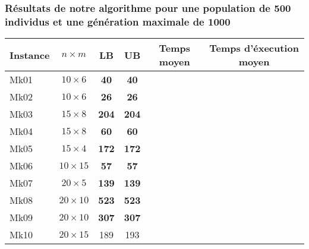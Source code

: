 \subsubsection{Résultats de notre algorithme pour une population de 500 individus et une génération maximale de 1000}

\begin{table}[!h]
    \renewcommand{\arraystretch}{1.5}
    \centering
    \begin{tabular}{p{} c c c c c}
        Instance & $n \times m$ & LB & UB & Temps moyen & Temps d'éxecution moyen \\
         \hline
        Mk01 & $10 \times 6$ & \textbf{40} & \textbf{40} & & \\
         \hline
        Mk02 & $10 \times 6$ & \textbf{26} & \textbf{26} & & \\
         \hline
        Mk03 & $15 \times 8$ & \textbf{204} & \textbf{204} & & \\
         \hline
        Mk04 & $15 \times 8$ & \textbf{60} & \textbf{60} & & \\
         \hline
        Mk05 & $15 \times 4$ & \textbf{172} & \textbf{172} & & \\
         \hline
        Mk06 & $10 \times 15$ & \textbf{57} & \textbf{57} & & \\
         \hline
        Mk07 & $20 \times 5$ & \textbf{139} & \textbf{139} & & \\
         \hline
        Mk08 & $20 \times 10$ & \textbf{523} & \textbf{523} & & \\
         \hline
        Mk09 & $20 \times 10$ & \textbf{307} & \textbf{307} & & \\
         \hline
        Mk10 & $20 \times 15$ & 189 & 193 \\
         \hline 
    \end{tabular}
\end{table}